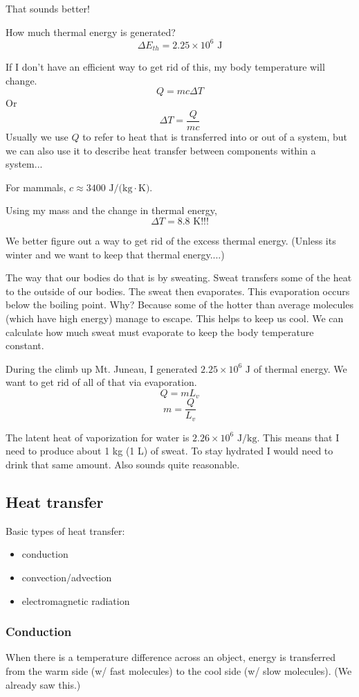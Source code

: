 That sounds better!

How much thermal energy is generated?
$$\Delta{E_{th}}=\boxed{2.25\times 10^6\mbox{ J}}$$

If I don't have an efficient way to get rid of this, my body temperature will change.
$$Q=mc\Delta{T}$$
Or
$$\Delta{T}=\frac{Q}{mc}$$
Usually we use $Q$ to refer to heat that is transferred into or out of a system, but we can also use it to describe heat transfer between components within a system...

For mammals, $c\approx 3400\mbox{ J/(kg}\cdot\mbox{K)}$.

Using my mass and the change in thermal energy,
$$\boxed{\Delta{T}=8.8\mbox{ K!!!}}$$

We better figure out a way to get rid of the excess thermal energy. (Unless its winter and we want to keep that thermal energy....)

The way that our bodies do that is by sweating. Sweat transfers some of the heat to the outside of our bodies. The sweat then evaporates. This evaporation occurs below the boiling point. Why? Because some of the hotter than average molecules (which have high energy) manage to escape. This helps to keep us cool. We can calculate how much sweat must evaporate to keep the body temperature constant.

During the climb up Mt. Juneau, I generated $2.25\times 10^6\mbox{ J}$ of thermal energy. We want to get rid of all of that via evaporation.
$$Q=mL_v$$
$$m=\frac{Q}{L_v}$$

The latent heat of vaporization for water is $2.26\times 10^6\mbox{ J/kg}$. This means that I need to produce about 1 kg (1 L) of sweat. To stay hydrated I would need to drink that same amount. Also sounds quite reasonable.

\subsection{Heat transfer}
Basic types of heat transfer:
\begin{itemize}
\item conduction
\item convection/advection
\item electromagnetic radiation
\end{itemize}

\subsubsection{Conduction}
When there is a temperature difference across an object, energy is transferred from the warm side (w/ fast molecules) to the cool side (w/ slow molecules). (We already saw this.)

